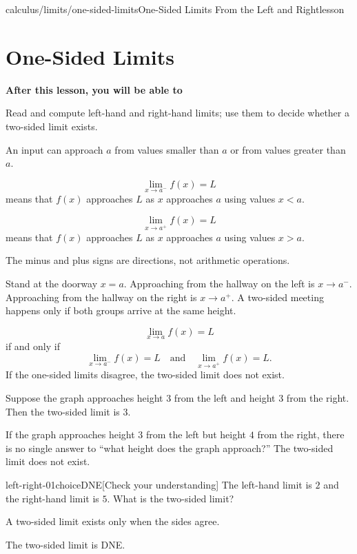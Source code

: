 \documentclass[11pt,openany]{book}
\theoremstyle{bgplain}
\newcounter{bgcheck}[section]
\newcommand{\lessonobjective}[1]{%
  \par\Needspace{4\baselineskip}\addvspace{0.6em}%
  {\bfseries\color{BGInk}After this lesson, you will be able to}\par\smallskip
  #1\par\addvspace{0.5em}%
}
\begin{document}
\begin{webpage}{calculus/limits/one-sided-limits}{One-Sided Limits From the Left and Right}{lesson}
\section{One-Sided Limits}

\lessonobjective{
Read and compute left-hand and right-hand limits; use them to decide whether a two-sided limit exists.
}

An input can approach \(a\) from values smaller than \(a\) or from values greater than \(a\).

\begin{bgdefinition}[title={One-Sided Limit Notation}]
\[
  \lim_{x\to a^-}f(x)=L
\]
means that \(f(x)\) approaches \(L\) as \(x\) approaches \(a\) using values \(x<a\).

\[
  \lim_{x\to a^+}f(x)=L
\]
means that \(f(x)\) approaches \(L\) as \(x\) approaches \(a\) using values \(x>a\).
\end{bgdefinition}

The minus and plus signs are directions, not arithmetic operations.

\begin{bgconcept}
Stand at the doorway \(x=a\). Approaching from the hallway on the left is \(x\to a^-\). Approaching from the hallway on the right is \(x\to a^+\). A two-sided meeting happens only if both groups arrive at the same height.
\end{bgconcept}

\begin{bgtheorem}[title={One-Sided Test for a Two-Sided Limit}]
\[
  \boxed{\lim_{x\to a}f(x)=L}
\]
if and only if
\[
  \boxed{\lim_{x\to a^-}f(x)=L
  \quad\text{and}\quad
  \lim_{x\to a^+}f(x)=L.}
\]
If the one-sided limits disagree, the two-sided limit does not exist.
\end{bgtheorem}

\begin{bgguided}[title={Two staircases}]
Suppose the graph approaches height \(3\) from the left and height \(3\) from the right. Then the two-sided limit is \(3\).

If the graph approaches height \(3\) from the left but height \(4\) from the right, there is no single answer to ``what height does the graph approach?'' The two-sided limit does not exist.
\end{bgguided}


\begin{bgcheck}{left-right-01}{choice}{DNE}[Check your understanding]
The left-hand limit is \(2\) and the right-hand limit is \(5\). What is the two-sided limit?
\begin{bghint}
A two-sided limit exists only when the sides agree.
\end{bghint}
\begin{bgreveal}
The two-sided limit is DNE.
\end{bgreveal}
\end{bgcheck}


\end{webpage}
\end{document}
